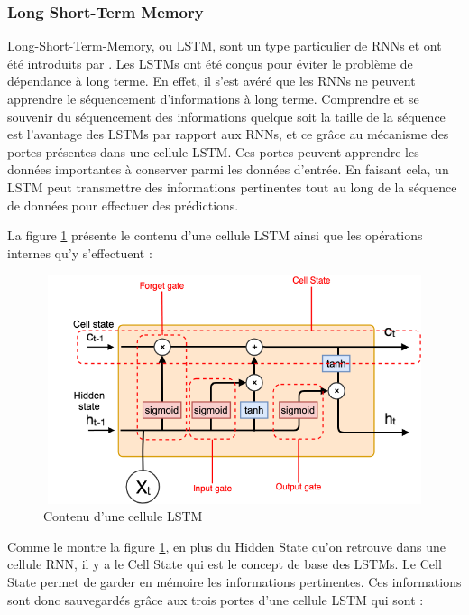 \subsubsection{Long Short-Term Memory}
Long-Short-Term-Memory, ou LSTM, sont un type particulier de RNNs et ont été introduits par \cite{lstmdef}. Les LSTMs ont été conçus pour éviter le problème de dépendance à long terme. En effet, il s'est avéré que les RNNs ne peuvent apprendre le séquencement d'informations à long terme. Comprendre et se souvenir du séquencement des informations quelque soit la taille de la séquence est l'avantage des LSTMs par rapport aux RNNs, et ce grâce au mécanisme des portes présentes dans une cellule LSTM. Ces portes peuvent apprendre les données importantes à conserver parmi les données d'entrée. En faisant cela, un LSTM peut transmettre des informations pertinentes tout au long de la séquence de données pour effectuer des prédictions.

La figure \ref{LSTM} présente le contenu d'une cellule LSTM ainsi que les opérations internes qu'y s'effectuent : 

\begin{figure}[H]
    \centering
    \includegraphics[height=190pt,width=325pt]{images/chap3/LSTM.png}
    \caption{Contenu d'une cellule LSTM \cite{LSTM_cell}}
    \label{LSTM}
\end{figure}

Comme le montre la figure \ref{LSTM}, en plus du Hidden State qu'on retrouve dans une cellule RNN, il y a le Cell State qui est le concept de base des LSTMs. Le Cell State permet de garder en mémoire les informations pertinentes. Ces informations sont donc sauvegardés grâce aux trois portes d'une cellule LSTM \cite{lstmgates} qui sont :

